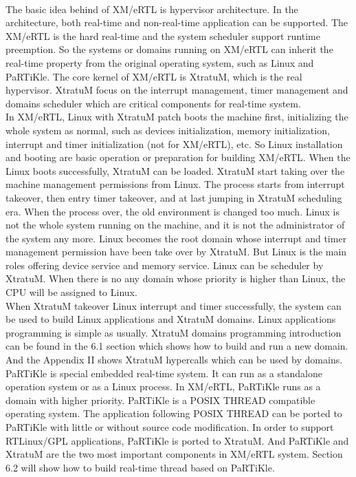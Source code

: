 \\
The basic idea behind of XM/eRTL is hypervisor architecture. In the architecture, both real-time and non-real-time application can be supported. The XM/eRTL is the hard real-time and the system scheduler support runtime preemption. So the systems or domains running on XM/eRTL can inherit the real-time property from the original operating system, such as Linux and PaRTiKle. The core kernel of XM/eRTL is XtratuM, which is the real hypervisor. XtratuM focus on the interrupt management, timer management and domains scheduler which are critical components for real-time system. 
\\
In XM/eRTL, Linux with XtratuM patch boots the machine first, initializing the whole system as normal, such as devices initialization, memory initialization, interrupt and timer initialization (not for XM/eRTL), etc. So Linux installation and booting are basic operation or preparation for building XM/eRTL. When the Linux boots successfully, XtratuM can be loaded. XtratuM start taking over the machine management permissions from Linux. The process starts from interrupt takeover, then entry timer takeover, and at last jumping in XtratuM scheduling era. When the process over, the old environment is changed too much. Linux is not the whole system running on the machine, and it is not the administrator of the system any more. Linux becomes the root domain whose interrupt and timer management permission have been take over by XtratuM. But Linux is the main roles offering device service and memory service. Linux can be scheduler by XtratuM. When there is no any domain whose priority is higher than Linux, the CPU will be assigned to Linux. 
\\
When XtratuM takeover Linux interrupt and timer successfully, the system can be used to build Linux applications and XtratuM domains. Linux applications programming is simple as usually. XtratuM domains programming introduction can be found in the 6.1 section which shows how to build and run a new domain. And the Appendix II shows XtratuM hypercalls which can be used by domains.
\\
PaRTiKle is special embedded real-time system. It can run as a standalone operation system or as a Linux process. In XM/eRTL, PaRTiKle runs as a domain with higher priority. PaRTiKle is a POSIX THREAD compatible operating system. The application following POSIX THREAD can be ported to PaRTiKle with little or without source code modification. In order to support RTLinux/GPL applications, PaRTiKle is ported to XtratuM. And PaRTiKle and XtratuM are the two most important components in XM/eRTL system. Section 6.2 will show how to build real-time thread based on PaRTiKle.
